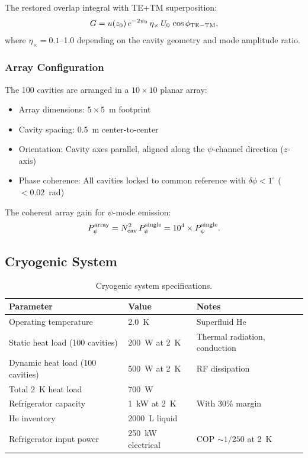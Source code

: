 \documentclass[11pt,letterpaper]{article}
\begin{document}
The restored overlap integral with TE+TM superposition:
\begin{equation}
G = u(z_0)\,e^{-2\psi_0}\,\eta_\times\,U_0\,\cos\phi_{\rm TE-TM},
\end{equation}
where $\eta_\times = 0.1$--1.0 depending on the cavity geometry and
mode amplitude ratio.

\subsubsection{Array Configuration}

The 100 cavities are arranged in a $10 \times 10$ planar array:
\begin{itemize}
\item Array dimensions: $5 \times 5$~m footprint
\item Cavity spacing: 0.5~m center-to-center
\item Orientation: Cavity axes parallel, aligned along the
$\psi$-channel direction ($z$-axis)
\item Phase coherence: All cavities locked to common reference
with $\delta\phi < 1^\circ$ ($< 0.02$~rad)
\end{itemize}

The coherent array gain for $\psi$-mode emission:
\begin{equation}
P_\psi^{\rm array} = N_{\rm cav}^2\,P_\psi^{\rm single}
= 10^4 \times P_\psi^{\rm single}.
\end{equation}

\subsection{Cryogenic System}

\begin{table}[H]
\caption{Cryogenic system specifications.}
\begin{tabular}{lll}
\toprule
Parameter & Value & Notes \\
\midrule
Operating temperature & 2.0~K & Superfluid He \\
Static heat load (100 cavities) & 200~W at 2~K & Thermal radiation, conduction \\
Dynamic heat load (100 cavities) & 500~W at 2~K & RF dissipation \\
Total 2~K heat load & 700~W & \\
Refrigerator capacity & 1~kW at 2~K & With 30\% margin \\
He inventory & 2000~L liquid & \\
Refrigerator input power & 250~kW electrical & COP $\sim 1/250$ at 2~K \\
\bottomrule
\end{tabular}
\end{table}
\end{document}
